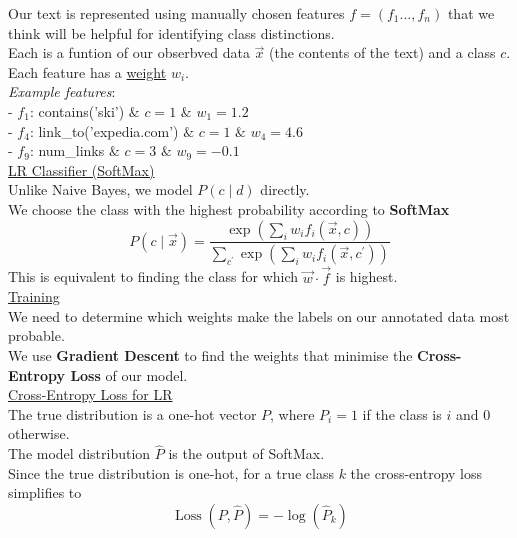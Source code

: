 \documentclass[8pt]{extarticle} %
\begin{document}
\begin{multicols*}{3}
Our text is represented using manually chosen features $f=(f_1\dots,f_n)$ that we think will be helpful for identifying class distinctions.\\

Each is a funtion of our obserbved data $\vec{x}$ (the contents of the text) and a class $c$.\\

Each feature has a \underline{weight} $w_i$.\\

\textit{Example features}:\\
- $f_1$: contains('ski') $\&$ $c=1$ $\&$ $w_1=1.2$ \\
- $f_4$: link\_to('expedia.com') $\&$ $c=1$ $\&$ $w_4=4.6$ \\
- $f_9$: num\_links $\&$ $c=3$ $\&$ $w_9=-0.1$\\

\underline{LR Classifier (SoftMax)}\\

Unlike Naive Bayes, we model $P(c \mid d)$ directly.\\

We choose the class with the highest probability according to \textbf{SoftMax}
$$
P(c \mid \vec{x})=\frac{\exp \left(\sum_i w_i f_i(\vec{x}, c)\right)}{\sum_{c^{\prime}} \exp \left(\sum_i w_i f_i\left(\vec{x}, c^{\prime}\right)\right)} 
$$
This is equivalent to finding the class for which $\vec{w} \cdot \vec{f}$ is highest.\\

\underline{Training}\\

We need to determine which weights make the labels on our annotated data most probable.\\
We use \textbf{Gradient Descent} to find the weights that minimise the \textbf{Cross-Entropy Loss} of our model.\\

\underline{Cross-Entropy Loss for LR}\\

The true distribution is a one-hot vector $P$, where $P_i=1$ if the class is $i$ and $0$ otherwise.\\
The model distribution $\hat{P}$ is the output of SoftMax.\\

Since the true distribution is one-hot, for a true class $k$ the cross-entropy loss simplifies to
$$\operatorname{Loss}\left(P, \hat{P}\right)=-\log \left(\hat{P}_k\right)$$


\end{multicols*}
\end{document}
